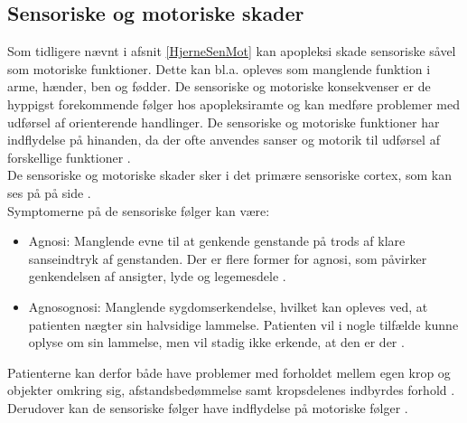 \subsection{Sensoriske og motoriske skader} %
Som tidligere nævnt i afsnit \ref{HjerneSenMot} kan apopleksi skade sensoriske såvel som motoriske funktioner. Dette kan bl.a. opleves som manglende funktion i arme, hænder, ben og fødder. De sensoriske og motoriske konsekvenser er de hyppigst forekommende følger hos apopleksiramte og kan medføre problemer med udførsel af orienterende handlinger. \cite{Kruuse2015a,DSfA2009}  De sensoriske og motoriske funktioner har indflydelse på hinanden, da der ofte anvendes sanser og motorik til udførsel af forskellige funktioner \cite{Nichols1997}.  \\
De sensoriske og motoriske skader sker i det primære sensoriske cortex, som kan ses på  på side \pageref{Enc} .\\

\noindent Symptomerne på de sensoriske følger kan være:
\begin{itemize}
  \item Agnosi: Manglende evne til at genkende genstande på trods af klare sanseindtryk af genstanden. Der er flere former for agnosi, som påvirker genkendelsen af ansigter, lyde og legemesdele \cite{Redaktionen2015}. 
 \item Agnosognosi: Manglende sygdomserkendelse, hvilket kan opleves ved, at patienten nægter sin halvsidige lammelse. Patienten vil i nogle tilfælde kunne oplyse om sin lammelse, men vil stadig ikke erkende, at den er der \cite{Pedersen1999}.
\end{itemize}
Patienterne kan derfor både have problemer med forholdet mellem egen krop og objekter omkring sig, afstandsbedømmelse samt kropsdelenes indbyrdes forhold \cite{Kruuse2015a,DSfA2009}. Derudover kan de sensoriske følger have indflydelse på motoriske følger \cite{Nichols1997}. \\


